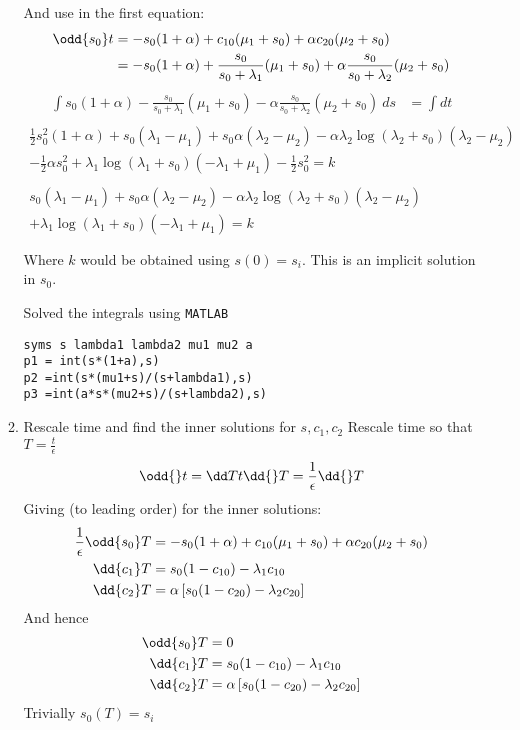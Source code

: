 \documentclass{X:/Documents/Coding/Latex/myassignment}
\begin{document}
\begin{enumerate}
\begin{enumerate}
		And use in the first equation:
		\begin{align*}
			\odd{s_0}t &= -s_0 (1+\alpha) + c_{10} (\mu_1 + s_0) + \alpha c_{20} ( \mu_2 + s_0)\\
			&= -s_0 (1+\alpha) + \frac{s_0}{s_0+\lambda_1} (\mu_1 + s_0) + \alpha \frac{s_0}{s_0+\lambda_2} ( \mu_2 + s_0)\\
		\end{align*}
		\begin{align*}
			\int s_0 (1+\alpha) - \frac{s_0}{s_0+\lambda_1} (\mu_1 + s_0) - \alpha \frac{s_0}{s_0+\lambda_2} ( \mu_2 + s_0) \ ds &= \int dt\\
		\end{align*}
		\begin{align*}
			\frac{1}{2}s_0^2 (1+\alpha) + s_0(\lambda_1 - \mu_1) + s_0\alpha (\lambda_2 - \mu_2) - \alpha \lambda_2\log(\lambda_2 + s_0)(\lambda_2 - \mu_2) \\- \frac12\alpha s_0^2 + \lambda_1\log(\lambda_1 + s_0)(- \lambda_1 + \mu_1) - \frac12 s_0^2 = k\\\\
			s_0(\lambda_1 - \mu_1) + s_0\alpha (\lambda_2 - \mu_2) - \alpha \lambda_2\log(\lambda_2 + s_0)(\lambda_2 - \mu_2) \\+ \lambda_1\log(\lambda_1 + s_0)(- \lambda_1 + \mu_1)  = k\\\\
		\end{align*}
		Where $k$ would be obtained using $s(0) = s_i$.
		This is an implicit solution in $s_0$.

		Solved the integrals using \verb|MATLAB|
		\begin{lstlisting}
syms s lambda1 lambda2 mu1 mu2 a
p1 = int(s*(1+a),s)
p2 =int(s*(mu1+s)/(s+lambda1),s)
p3 =int(a*s*(mu2+s)/(s+lambda2),s)
		\end{lstlisting}
		\item Rescale time and find the inner solutions for $s,c_1,c_2$
		Rescale time so that $T = \frac{t}{\epsilon}$
		\[\odd{}t = \dd Tt \dd{}T = \frac1 \epsilon \dd{}T\]
		Giving (to leading order) for the inner solutions:
		\begin{align*}
			\frac{1}{\epsilon}\odd{s_0}T &= -s_0 (1+\alpha) + c_{10} (\mu_1 + s_0) + \alpha c_{20} ( \mu_2 + s_0)\\
			\dd{c_1}T &= s_0(1-c_{10}) - \lambda_1 c_{10}\\
			\dd{c_2}T &= \alpha \left[ s_0 (1- c_{20}) - \lambda_2 c_{20}\right]
		\end{align*}
		And hence
		\begin{align*}
			\odd{s_0}T &= 0\\
			\dd{c_1}T &= s_0(1-c_{10}) - \lambda_1 c_{10}\\
			\dd{c_2}T &= \alpha \left[ s_0 (1- c_{20}) - \lambda_2 c_{20}\right]
		\end{align*}
		Trivially $s_0(T) = s_i$


\end{enumerate}
\end{enumerate}
\end{document}
